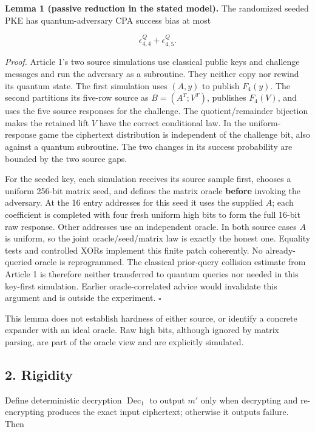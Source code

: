 \documentclass[11pt,a4paper]{article}
\begin{document}
\textbf{Lemma 1 (passive reduction in the stated model).} The randomized seeded PKE has quantum-adversary CPA success bias at most

\[
\epsilon_{4,4}^{Q}+\epsilon_{4,5}^{Q}.
\]

\emph{Proof.} Article 1's two source simulations use classical public keys and challenge messages and run the adversary as a subroutine. They neither copy nor rewind its quantum state. The first simulation uses \((A,y)\) to publish \(F_4(y)\). The second partitions its five-row source as \(B=(A^T;V^T)\), publishes \(F_4(V)\), and uses the five source responses for the challenge. The quotient/remainder bijection makes the retained lift \(V\) have the correct conditional law. In the uniform-response game the ciphertext distribution is independent of the challenge bit, also against a quantum subroutine. The two changes in its success probability are bounded by the two source gaps.

For the seeded key, each simulation receives its source sample first, chooses a uniform 256-bit matrix seed, and defines the matrix oracle \textbf{before} invoking the adversary. At the 16 entry addresses for this seed it uses the supplied \(A\); each coefficient is completed with four fresh uniform high bits to form the full 16-bit raw response. Other addresses use an independent oracle. In both source cases \(A\) is uniform, so the joint oracle/seed/matrix law is exactly the honest one. Equality tests and controlled XORs implement this finite patch coherently. No already-queried oracle is reprogrammed. The classical prior-query collision estimate from Article 1 is therefore neither transferred to quantum queries nor needed in this key-first simulation. Earlier oracle-correlated advice would invalidate this argument and is outside the experiment. \(\square\)

This lemma does not establish hardness of either source, or identify a concrete expander with an ideal oracle. Raw high bits, although ignored by matrix parsing, are part of the oracle view and are explicitly simulated.

\subsection{2. Rigidity}\label{rigidity}

Define deterministic decryption \(\operatorname{Dec}_1\) to output \(m'\) only when decrypting and re-encrypting produces the exact input ciphertext; otherwise it outputs failure. Then
\end{document}
